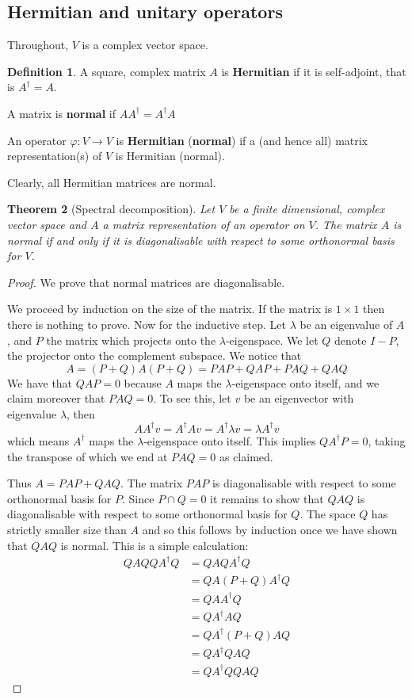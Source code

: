 \documentclass[12pt]{article}
\theoremstyle{plain}
\newtheorem{thm}{Theorem}[subsection] %
\theoremstyle{definition}
\newtheorem{defn}[thm]{Definition} %
\newcommand{\lto}{\longrightarrow}
\begin{document}
\subsection{Hermitian and unitary operators}\label{sec:Hermitian_Unitary}
Throughout, $V$ is a complex vector space.
\begin{defn}
	A square, complex matrix $A$ is \textbf{Hermitian} if it is self-adjoint, that is $A^\dagger = A$.
	
	A matrix is \textbf{normal} if $AA^\dagger = A^\dagger A$
	
	An operator $\varphi:V \lto V$ is \textbf{Hermitian} (\textbf{normal}) if a (and hence all) matrix representation(s) of $V$ is Hermitian (normal).
\end{defn}
Clearly, all Hermitian matrices are normal.
\begin{thm}[Spectral decomposition]\label{thm:spectral}
	Let $V$ be a finite dimensional, complex vector space and $A$ a matrix representation of an operator on $V$. The matrix $A$ is normal if and only if it is diagonalisable with respect to some orthonormal basis for $V$.
\end{thm}
\begin{proof}
	We prove that normal matrices are diagonalisable.
	
	We proceed by induction on the size of the matrix. If the matrix is $1\times 1$ then there is nothing to prove. Now for the inductive step. Let $\lambda$ be an eigenvalue of $A$, and $P$ the matrix which projects onto the $\lambda$-eigenspace. We let $Q$ denote $I - P$, the projector onto the complement subspace.  We notice that
	\begin{equation}
		A = (P + Q)A(P + Q)= PAP + QAP + PAQ + QAQ
	\end{equation}
	We have that $QAP = 0$ because $A$ maps the $\lambda$-eigenspace onto itself, and we claim moreover that $PAQ = 0$. To see this, let $v$ be an eigenvector with eigenvalue $\lambda$, then
	\begin{equation}
		AA^{\dagger}v = A^{\dagger}Av = A^{\dagger} \lambda v = \lambda A^\dagger v
	\end{equation}
	which means $A^\dagger$ maps the $\lambda$-eigenspace onto itself. This implies $QA^\dagger P = 0$, taking the transpose of which we end at $P A Q = 0$ as claimed.
	
	Thus $A = PAP + QAQ$. The matrix $PAP$ is diagonalisable with respect to some orthonormal basis for $P$. Since $P \cap Q = 0$ it remains to show that $QAQ$ is diagonalisable with respect to some orthonormal basis for $Q$. The space $Q$ has strictly smaller size than $A$ and so this follows by induction once we have shown that $QAQ$ is normal. This is a simple calculation:
	\begin{align*}
		QAQQA^\dagger Q &= QAQA^\dagger Q\\
		&= QA(P + Q)A^\dagger Q\\
		&= QAA^\dagger Q\\
		&= QA^\dagger AQ\\
		&= QA^\dagger (P + Q)AQ\\
		&= QA^\dagger QAQ \\
		&= QA^\dagger QQ A Q
	\end{align*}
\end{proof}
\end{document}

